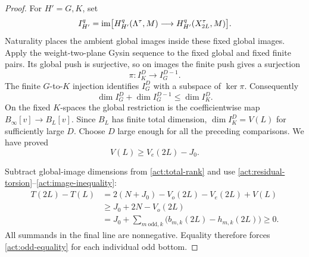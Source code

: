 \begin{proof}
For $H'=G,K$, set
\[
 I_{H'}^q=\operatorname{im}\bigl[H_{H'}^q(\Lambda^\tau,M)
       \longrightarrow H_{H'}^q(X_{2L}^\tau,M)\bigr].
\]
Naturality places the ambient global images inside these fixed global
images. Apply the weight-two-plane Gysin sequence to the fixed global
and fixed finite pairs. Its global push is surjective, so on images
the finite push gives a surjection
\[
 \pi:I_K^D\longrightarrow I_G^{D-1}.
\]
The finite $G$-to-$K$ injection identifies $I_G^D$ with a subspace of
$\ker\pi$. Consequently
\[
 \dim I_G^D+\dim I_G^{D-1}\le\dim I_K^D.
\]
On the fixed $K$-spaces the global restriction is the coefficientwise
map $B_\infty[v]\to B_L[v]$. Since $B_L$ has finite total dimension,
$\dim I_K^D=V(L)$ for sufficiently large $D$. Choose $D$ large enough
for all the preceding comparisons. We have proved
\begin{equation}\label{act:image-inequality}
 V(L)\ge V_e(2L)-J_0.
\end{equation}

Subtract global-image dimensions from \eqref{act:total-rank} and use
\eqref{act:residual-torsion}--\eqref{act:image-inequality}:
\begin{align*}
 T(2L)-T(L)
 &=2(N+J_0)-V_o(2L)-V_e(2L)+V(L)\\
 &\ge J_0+2N-V_o(2L)\\
 &=J_0+\sum_{m\ \mathrm{odd},k}
       \bigl(b_{m,k}(2L)-h_{m,k}(2L)\bigr)\ge0.
\end{align*}
All summands in the final line are nonnegative. Equality therefore
forces \eqref{act:odd-equality} for each individual odd bottom.
\end{proof}

